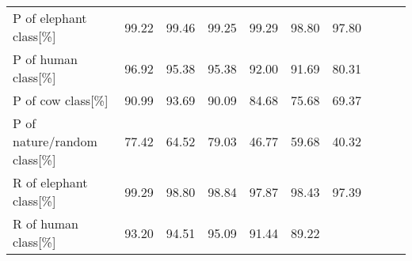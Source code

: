 \begin{table}[ht]
{\begin{tabular}{lrrrrrrrrr}
        P of elephant class[\%]         & \cellcolor{tbyellow}99.22     
                                        & \cellcolor{tbgreen}99.46   
                                        & \cellcolor{tbyellow}99.25   
                                        & \cellcolor{tbgreeny}99.29  
                                        & \cellcolor{tbyellow}98.80  
                                        & \cellcolor{tbred}97.80\\
        P of human class[\%]            & \cellcolor{tbgreen}96.92     
                                        & \cellcolor{tbgreeny}95.38   
                                        & \cellcolor{tbgreeny}95.38   
                                        & \cellcolor{tbyellow}92.00  
                                        & \cellcolor{tbyellow}91.69  
                                        & \cellcolor{tbred}80.31\\
        P of cow class[\%]              & \cellcolor{tbgreeny}90.99     
                                        & \cellcolor{tbgreen}93.69   
                                        & \cellcolor{tbyellow}90.09   
                                        & \cellcolor{tbyellow}84.68  
                                        & \cellcolor{tbyellow}75.68  
                                        & \cellcolor{tbred}69.37\\
        P of nature/random class[\%]    & \cellcolor{tbgreeny}77.42     
                                        & \cellcolor{tbyellow}64.52   
                                        & \cellcolor{tbgreen}79.03   
                                        & \cellcolor{tbyellow}46.77  
                                        & \cellcolor{tbyellow}59.68 
                                        & \cellcolor{tbred}40.32\\\midrule
        R of elephant class[\%]         & \cellcolor{tbgreen}99.29     
                                        & \cellcolor{tbyellow}98.80   
                                        & \cellcolor{tbgreeny}98.84   
                                        & \cellcolor{tbyellow}97.87  
                                        & \cellcolor{tbyellow}98.43  
                                        & \cellcolor{tbred}97.39\\
        R of human class[\%]            & \cellcolor{tbyellow}93.20     
                                        & \cellcolor{tbgreeny}94.51   
                                        & \cellcolor{tbgreen}95.09   
                                        & \cellcolor{tbyellow}91.44  
                                        & \cellcolor{tbyellow}89.22  

\end{tabular}}
\end{table}
